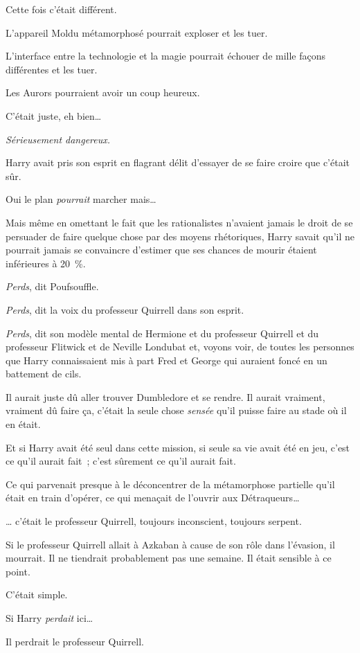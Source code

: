 Cette fois c'était différent.

L'appareil Moldu métamorphosé pourrait exploser et les tuer.

L'interface entre la technologie et la magie pourrait échouer de mille façons différentes et les tuer.

Les Aurors pourraient avoir un coup heureux.

C'était juste, eh bien…

\emph{Sérieusement dangereux.}

Harry avait pris son esprit en flagrant délit d'essayer de se faire croire que c'était sûr.

Oui le plan \emph{pourrait} marcher mais…

Mais même en omettant le fait que les rationalistes n'avaient jamais le droit de se persuader de faire quelque chose par des moyens rhétoriques, Harry savait qu'il ne pourrait jamais se convaincre d'estimer que ses chances de mourir étaient inférieures à 20~\%.

\emph{Perds}, dit Poufsouffle.

\emph{Perds}, dit la voix du professeur Quirrell dans son esprit.

\emph{Perds}, dit son modèle mental de Hermione et du professeur Quirrell et du professeur Flitwick et de Neville Londubat et, voyons voir, de toutes les personnes que Harry connaissaient mis à part Fred et George qui auraient foncé en un battement de cils.

Il aurait juste dû aller trouver Dumbledore et se rendre.
Il aurait vraiment, vraiment dû faire ça, c'était la seule chose \emph{sensée} qu'il puisse faire au stade où il en était.

Et si Harry avait été seul dans cette mission, si seule sa vie avait été en jeu, c'est ce qu'il aurait fait~; c'est sûrement ce qu'il aurait fait.

Ce qui parvenait presque à le déconcentrer de la métamorphose partielle qu'il était en train d'opérer, ce qui menaçait de l'ouvrir aux Détraqueurs…

… c'était le professeur Quirrell, toujours inconscient, toujours serpent.

Si le professeur Quirrell allait à Azkaban à cause de son rôle dans l'évasion, il mourrait.
Il ne tiendrait probablement pas une semaine.
Il était sensible à ce point.

C'était simple.

Si Harry \emph{perdait} ici…

Il perdrait le professeur Quirrell.


